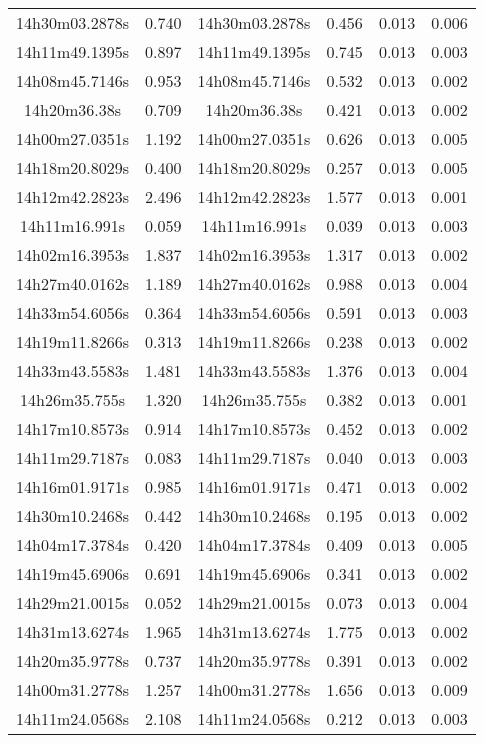 \begin{table}
\begin{tabular}{cccccc}
14h30m03.2878s & 0.740 & 14h30m03.2878s & 0.456 & 0.013 & 0.006 \\
14h11m49.1395s & 0.897 & 14h11m49.1395s & 0.745 & 0.013 & 0.003 \\
14h08m45.7146s & 0.953 & 14h08m45.7146s & 0.532 & 0.013 & 0.002 \\
14h20m36.38s & 0.709 & 14h20m36.38s & 0.421 & 0.013 & 0.002 \\
14h00m27.0351s & 1.192 & 14h00m27.0351s & 0.626 & 0.013 & 0.005 \\
14h18m20.8029s & 0.400 & 14h18m20.8029s & 0.257 & 0.013 & 0.005 \\
14h12m42.2823s & 2.496 & 14h12m42.2823s & 1.577 & 0.013 & 0.001 \\
14h11m16.991s & 0.059 & 14h11m16.991s & 0.039 & 0.013 & 0.003 \\
14h02m16.3953s & 1.837 & 14h02m16.3953s & 1.317 & 0.013 & 0.002 \\
14h27m40.0162s & 1.189 & 14h27m40.0162s & 0.988 & 0.013 & 0.004 \\
14h33m54.6056s & 0.364 & 14h33m54.6056s & 0.591 & 0.013 & 0.003 \\
14h19m11.8266s & 0.313 & 14h19m11.8266s & 0.238 & 0.013 & 0.002 \\
14h33m43.5583s & 1.481 & 14h33m43.5583s & 1.376 & 0.013 & 0.004 \\
14h26m35.755s & 1.320 & 14h26m35.755s & 0.382 & 0.013 & 0.001 \\
14h17m10.8573s & 0.914 & 14h17m10.8573s & 0.452 & 0.013 & 0.002 \\
14h11m29.7187s & 0.083 & 14h11m29.7187s & 0.040 & 0.013 & 0.003 \\
14h16m01.9171s & 0.985 & 14h16m01.9171s & 0.471 & 0.013 & 0.002 \\
14h30m10.2468s & 0.442 & 14h30m10.2468s & 0.195 & 0.013 & 0.002 \\
14h04m17.3784s & 0.420 & 14h04m17.3784s & 0.409 & 0.013 & 0.005 \\
14h19m45.6906s & 0.691 & 14h19m45.6906s & 0.341 & 0.013 & 0.002 \\
14h29m21.0015s & 0.052 & 14h29m21.0015s & 0.073 & 0.013 & 0.004 \\
14h31m13.6274s & 1.965 & 14h31m13.6274s & 1.775 & 0.013 & 0.002 \\
14h20m35.9778s & 0.737 & 14h20m35.9778s & 0.391 & 0.013 & 0.002 \\
14h00m31.2778s & 1.257 & 14h00m31.2778s & 1.656 & 0.013 & 0.009 \\
14h11m24.0568s & 2.108 & 14h11m24.0568s & 0.212 & 0.013 & 0.003 \\

\end{tabular}
\end{table}
